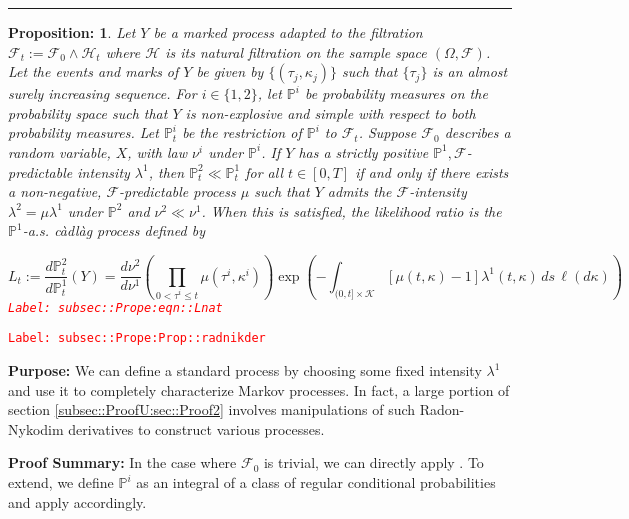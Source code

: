 \documentclass[12pt]{article}
\newcommand{\mb}{\mathbb}
\newcommand{\mc}{\mathcal}
\newcommand{\tr}{\textcolor{red}}
\newcommand{\labe}[1]{\tr{\texttt{Label: #1}}}
\newcommand{\purpose}{\textbf{Purpose: }}
\newcommand{\pfsum}{\textbf{Proof Summary: }}
\newcommand{\lin}{\rule{\linewidth}{0.4 pt}}
\newcommand{\pr}{\mb{P}}							%
\newtheorem{prop}[thms]{Proposition: }
\begin{document}
\lin

\begin{prop}
Let \(Y\) be a marked process adapted to the filtration \(\mc{F}_t := \mc{F}_0\wedge \mc{H}_t\) where \(\mc{H}\) is its natural filtration on the sample space \((\Omega,\mc{F})\). Let the events and marks of \(Y\) be given by \(\{(\tau_j,\kappa_j)\}\) such that \(\{\tau_j\}\) is an almost surely increasing sequence. For \(i \in \{1,2\}\), let \(\pr^i\) be probability measures on the probability space such that \(Y\) is non-explosive and simple with respect to both probability measures. Let \(\pr^i_t\) be the restriction of \(\pr^i\) to \(\mc{F}_t\). Suppose \(\mc{F}_0\) describes a random variable, \(X\), with law \(\nu^i\) under \(\pr^i\). If \(Y\) has a strictly positive \(\pr^1,\mc{F}\)-predictable intensity \(\lambda^1\), then \(\pr^2_t \ll \pr^1_t\) for all \(t \in [0,T]\) if and only if there exists a non-negative, \(\mc{F}\)-predictable process \(\mu\) such that \(Y\) admits the \(\mc{F}\)-intensity \(\lambda^2 = \mu\lambda^1\) under \(\pr^2\) and \(\nu^2 \ll \nu^1\). When this is satisfied, the likelihood ratio is the \(\pr^1\)-a.s. c\`adl\`ag process defined by 

\begin{equation}
L_t:= \frac{d\pr^2_t}{d\pr^1_t}(Y) = \frac{d\nu^2}{d\nu^1}\left(\prod_{0<\tau^i\leq t} \mu(\tau^i,\kappa^i)\right)\exp\left(-\int_{(0,t]\times \mc{K}}[\mu(t,\kappa) - 1]\lambda^1(t,\kappa)\,ds\,\ell(d\kappa)\right)
\label{subsec::Prope:eqn::Lnat}
\end{equation}
\labe{subsec::Prope:eqn::Lnat}
\label{subsec::Prope:Prop::radnikder}
\end{prop}
\labe{subsec::Prope:Prop::radnikder}

\purpose We can define a standard process by choosing some fixed intensity \(\lambda^1\) and use it to completely characterize Markov processes. In fact, a large portion of section \ref{subsec::ProofU:sec::Proof2} involves manipulations of such Radon-Nykodim derivatives to construct various processes.

\pfsum In the case where \(\mc{F}_0\) is trivial, we can directly apply \cite[Theorem 14.4.I]{DalVer08}. To extend, we define \(\pr^i\) as an integral of a class of regular conditional probabilities and apply \cite[Theorem 14.4.I]{DalVer08} accordingly.
\end{document}

